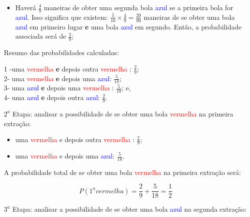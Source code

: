 \documentclass[
]{book}
\providecommand{\tightlist}{%
  \setlength{\itemsep}{0pt}\setlength{\parskip}{0pt}}
\begin{document}
\hfill\break

\begin{itemize}
\tightlist
\item
  Haverá \(\frac{4}{9}\) maneiras de obter uma segunda bola \textcolor{blue}{azul} se a primeira bola for \textcolor{blue}{azul}. Isso significa que existem: \(\frac{5}{10} \times \frac{4}{9}= \frac{20}{90}\) maneiras de se obter uma bola \textcolor{blue}{azul} em primeiro lugar \textbf{e} uma bola \textcolor{blue}{azul} em segundo. Então, a probabilidade associada será de \(\frac{2}{9}\);
\end{itemize}

\hfill\break

Resumo das probabilidades calculadas:

\hfill\break

1 -uma \textcolor{red}{vermelha} \textbf{e} depois outra \textcolor{red}{vermelha} : \(\frac{2}{9}\);\\
2- uma \textcolor{red}{vermelha} \textbf{e} depois uma \textcolor{blue}{azul}: \(\frac{5}{18}\);\\
3- uma \textcolor{blue}{azul} \textbf{e} depois uma \textcolor{red}{vermelha} : \(\frac{5}{18}\); e,\\
4- uma \textcolor{blue}{azul} \textbf{e} depois outra \textcolor{blue}{azul}: \(\frac{2}{9}\).

\hfill\break

\(2^{a}\) Etapa: analisar a possibilidade de se obter uma bola \textcolor{red}{vermelha} na primeira extração:

\hfill\break

\begin{itemize}
\tightlist
\item
  uma \textcolor{red}{vermelha} e depois outra \textcolor{red}{vermelha} : \(\frac{2}{9}\);\\
\item
  uma \textcolor{red}{vermelha} e depois uma \textcolor{blue}{azul}: \(\frac{5}{18}\).
\end{itemize}

\hfill\break

A probabilidade total de se obter uma bola \textcolor{red}{vermelha} na primeira extração será:

\hfill\break

\[
P(1^{a} vermelha)= \frac{2}{9} + \frac{5}{18} = \frac{1}{2}
\]

\hfill\break

\(3^{a}\) Etapa: analisar a possibilidade de se obter uma bola \textcolor{blue}{azul} na segunda extração:
\end{document}

